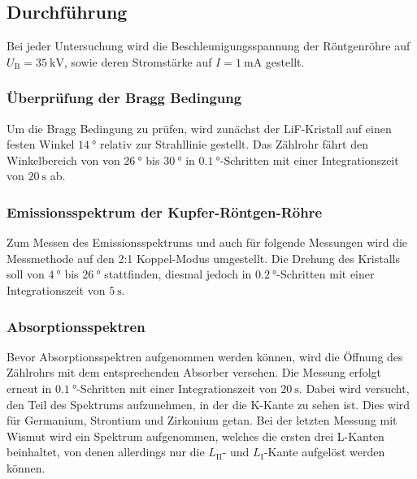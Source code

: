 \subsection{Durchführung}
\label{sec:durchführung}

Bei jeder Untersuchung wird die Beschleunigungsspannung der Röntgenröhre auf $U_{\text{B}} = \SI{35}{\kilo\volt}$, sowie deren Stromstärke auf $I = \SI{1}{\milli\ampere}$ gestellt.

\subsubsection{Überprüfung der Bragg Bedingung}
Um die Bragg Bedingung zu prüfen, wird zunächst der LiF-Kristall auf einen festen Winkel $\SI{14}{\degree}$ relativ zur Strahllinie gestellt.
Das Zählrohr fährt den Winkelbereich von von $\SI{26}{\degree}$ bis $\SI{30}{\degree}$ in $\SI{0,1}{\degree}$-Schritten mit einer Integrationszeit von $\SI{20}{\second}$ ab.

\subsubsection{Emissionsspektrum der Kupfer-Röntgen-Röhre}
Zum Messen des Emissionsspektrums und auch für folgende Messungen wird die Messmethode auf den 2:1 Koppel-Modus umgestellt.
Die Drehung des Kristalls soll von $\SI{4}{\degree}$ bis $\SI{26}{\degree}$ stattfinden, diesmal jedoch in $\SI{0,2}{\degree}$-Schritten  mit einer Integrationszeit von $\SI{5}{\second}$.

\subsubsection{Absorptionsspektren}
Bevor Absorptionsspektren aufgenommen werden können, wird die Öffnung des Zählrohrs mit dem entsprechenden Absorber versehen.
Die Messung erfolgt erneut in $\SI{0,1}{\degree}$-Schritten mit einer Integrationszeit von $\SI{20}{\second}$.
Dabei wird versucht, den Teil des Spektrums aufzunehmen, in der die K-Kante zu sehen ist.
Dies wird für Germanium, Strontium und Zirkonium getan.
Bei der letzten Messung mit Wismut wird ein Spektrum aufgenommen, welches die ersten drei L-Kanten beinhaltet, von denen allerdings nur die $L_\text{II}$- und $L_\text{I}$-Kante aufgelöst werden können.
